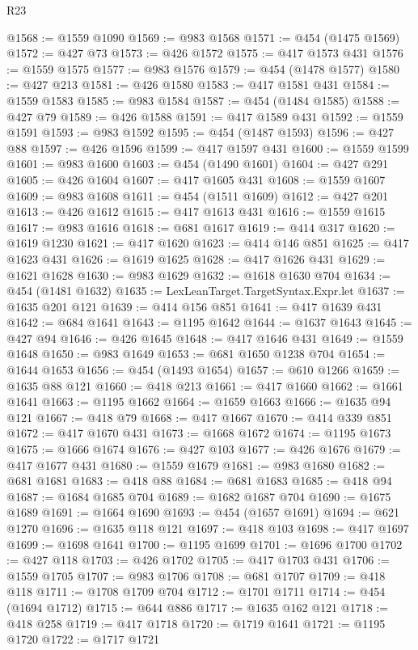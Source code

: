 \begin{lexlean}{R23}
\begin{coremodule}
{{{{{{{{{{{{{{{{{{{{{{{{{{{{{{{{{{{{{{{{{{{{{{{{{{{{{{{{{{{{{{{{{{{{{{{{{{{{{{{{{{{{{{{{{{{{{@1568 := @1559 @1090
@1569 := @983 @1568
@1571 := @454 (@1475 @1569)
@1572 := @427 @73
@1573 := @426 @1572
@1575 := @417 @1573 @431
@1576 := @1559 @1575
@1577 := @983 @1576
@1579 := @454 (@1478 @1577)
@1580 := @427 @213
@1581 := @426 @1580
@1583 := @417 @1581 @431
@1584 := @1559 @1583
@1585 := @983 @1584
@1587 := @454 (@1484 @1585)
@1588 := @427 @79
@1589 := @426 @1588
@1591 := @417 @1589 @431
@1592 := @1559 @1591
@1593 := @983 @1592
@1595 := @454 (@1487 @1593)
@1596 := @427 @88
@1597 := @426 @1596
@1599 := @417 @1597 @431
@1600 := @1559 @1599
@1601 := @983 @1600
@1603 := @454 (@1490 @1601)
@1604 := @427 @291
@1605 := @426 @1604
@1607 := @417 @1605 @431
@1608 := @1559 @1607
@1609 := @983 @1608
@1611 := @454 (@1511 @1609)
@1612 := @427 @201
@1613 := @426 @1612
@1615 := @417 @1613 @431
@1616 := @1559 @1615
@1617 := @983 @1616
@1618 := @681 @1617
@1619 := @414 @317
@1620 := @1619 @1230
@1621 := @417 @1620
@1623 := @414 @146 @851
@1625 := @417 @1623 @431
@1626 := @1619 @1625
@1628 := @417 @1626 @431
@1629 := @1621 @1628
@1630 := @983 @1629
@1632 := @1618 @1630 @704
@1634 := @454 (@1481 @1632)
@1635 := LexLeanTarget.TargetSyntax.Expr.let
@1637 := @1635 @201 @121
@1639 := @414 @156 @851
@1641 := @417 @1639 @431
@1642 := @684 @1641
@1643 := @1195 @1642
@1644 := @1637 @1643
@1645 := @427 @94
@1646 := @426 @1645
@1648 := @417 @1646 @431
@1649 := @1559 @1648
@1650 := @983 @1649
@1653 := @681 @1650 @1238 @704
@1654 := @1644 @1653
@1656 := @454 (@1493 @1654)
@1657 := @610 @1266
@1659 := @1635 @88 @121
@1660 := @418 @213
@1661 := @417 @1660
@1662 := @1661 @1641
@1663 := @1195 @1662
@1664 := @1659 @1663
@1666 := @1635 @94 @121
@1667 := @418 @79
@1668 := @417 @1667
@1670 := @414 @339 @851
@1672 := @417 @1670 @431
@1673 := @1668 @1672
@1674 := @1195 @1673
@1675 := @1666 @1674
@1676 := @427 @103
@1677 := @426 @1676
@1679 := @417 @1677 @431
@1680 := @1559 @1679
@1681 := @983 @1680
@1682 := @681 @1681
@1683 := @418 @88
@1684 := @681 @1683
@1685 := @418 @94
@1687 := @1684 @1685 @704
@1689 := @1682 @1687 @704
@1690 := @1675 @1689
@1691 := @1664 @1690
@1693 := @454 (@1657 @1691)
@1694 := @621 @1270
@1696 := @1635 @118 @121
@1697 := @418 @103
@1698 := @417 @1697
@1699 := @1698 @1641
@1700 := @1195 @1699
@1701 := @1696 @1700
@1702 := @427 @118
@1703 := @426 @1702
@1705 := @417 @1703 @431
@1706 := @1559 @1705
@1707 := @983 @1706
@1708 := @681 @1707
@1709 := @418 @118
@1711 := @1708 @1709 @704
@1712 := @1701 @1711
@1714 := @454 (@1694 @1712)
@1715 := @644 @886
@1717 := @1635 @162 @121
@1718 := @418 @258
@1719 := @417 @1718
@1720 := @1719 @1641
@1721 := @1195 @1720
@1722 := @1717 @1721
}}}}}}}}}}}}}}}}}}}}}}}}}}}}}}}}}}}}}}}}}}}}}}}}}}}}}}}}}}}}}}}}}}}}}}}}}}}}}}}}}}}}}}}}}}}}}
\end{coremodule}
\end{lexlean}
